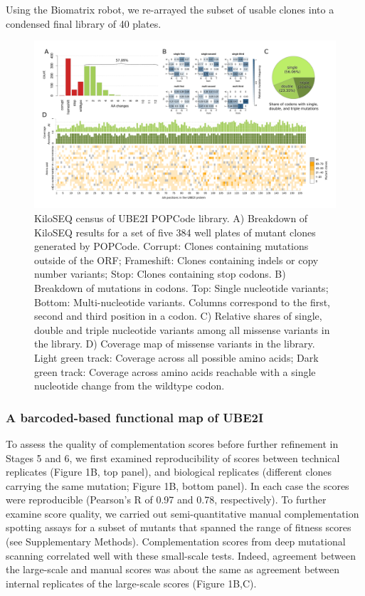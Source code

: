 Using the Biomatrix robot, we re-arrayed the subset of usable clones into a condensed final library of 40 plates.



\begin{figure}[h!]
	\centering
	\includegraphics[width=\textwidth]{img/popcode_census.pdf}
	\caption{KiloSEQ census of UBE2I POPCode library. A) Breakdown of KiloSEQ results for a set of five 384 well plates of mutant clones generated by POPCode. Corrupt: Clones containing mutations outside of the ORF; Frameshift: Clones containing indels or copy number variants; Stop: Clones containing stop codons. B) Breakdown of mutations in codons. Top: Single nucleotide variants; Bottom: Multi-nucleotide variants. Columns correspond to the first, second and third position in a codon. C) Relative shares of single, double and triple nucleotide variants among all missense variants in the library. D) Coverage map of missense variants in the library. Light green track: Coverage across all possible amino acids; Dark green track: Coverage across amino acids reachable with a single nucleotide change from the wildtype codon.}
	\label{fig:popcode_census}
\end{figure}


\subsubsection{A barcoded-based functional map of UBE2I}

To assess the quality of complementation scores before further refinement in Stages 5 and 6, we first examined reproducibility of scores between technical replicates (Figure 1B, top panel), and biological replicates (different clones carrying the same mutation; Figure 1B, bottom panel).  In each case the scores were reproducible (Pearson’s R of 0.97 and 0.78, respectively).   To further examine score quality, we carried out semi-quantitative manual complementation spotting assays for a subset of mutants that spanned the range of fitness scores (see Supplementary Methods). Complementation scores from deep mutational scanning correlated well with these small-scale tests. Indeed, agreement between the large-scale and manual scores was about the same as agreement between internal replicates of the large-scale scores (Figure 1B,C). 


